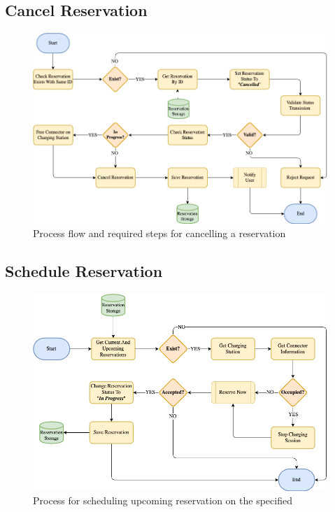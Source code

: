 \subsection{Cancel Reservation}
\label{ch:Design:sec:Use Cases:ssec:Cancel Reservation}

\begin{figure}[!ht]
    \centering
    \includegraphics[scale=0.4]{resources/images/main/5_design/processes/ReservationCancel.png}
    \caption{Process flow and required steps for cancelling a reservation}
    \label{fig:cancel-reservation-flowchart}
\end{figure}

\subsection{Schedule Reservation}
\label{ch:Design:sec:Use Cases:ssec:Schedule Reservation}

\begin{figure}[!ht]
    \centering
    \includegraphics[scale=0.4]{resources/images/main/5_design/processes/scheduler/SynchronizeReservation.png}
    \caption{Process for scheduling upcoming reservation on the specified }
    \label{fig:schedule-reservation-flowchart}
\end{figure}

